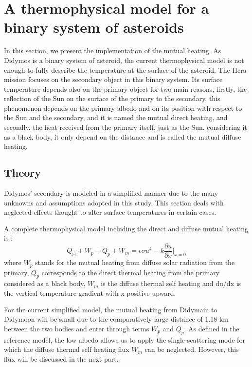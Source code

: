 \section{A thermophysical model for a binary system of asteroids}
\label{mutual}

In this section, we present the implementation of the mutual heating. As Didymos is a binary system of asteroid, the current thermophysical model is not enough to fully describe the temperature at the surface of the asteroid. The Hera mission focuses on the secondary object in this binary system. Its surface temperature depends also on the primary object for two main reasons, firstly, the reflection of the Sun on the surface of the primary to the secondary, this phenomenon depends on the primary albedo and on its position with respect to the Sun and the secondary, and it is named the mutual direct heating, and secondly, the heat received from the primary itself, just as the Sun, considering it as a black body, it only depend on the distance and is called the mutual diffuse heating.

\subsection{Theory}

Didymos’ secondary is modeled in a simplified manner due to the many unknowns and assumptions adopted in this study. This section deals with neglected effects thought to alter surface temperatures in certain cases.

A complete thermophysical model including the direct and diffuse mutual heating is \cite{pelivan}:
\begin{equation}
    Q_\odot+W_p+Q_p+W_m=\epsilon\sigma u^4-k\frac{\partial{u}}{\partial{x}}\Big|_{x=0}
    \label{eq:4.1}
\end{equation}
where $W_p$ stands for the mutual heating from diffuse solar radiation from the primary, $Q_p$ corresponds to the direct thermal heating from the primary considered as a black body, $W_m$ is the diffuse thermal self heating and du/dx is the vertical temperature gradient with x positive upward.

For the current simplified model, the mutual heating from Didymain to Didymoon will be small due to the comparatively large distance of 1.18 km \citep{model} between the two bodies and enter through terms $W_p$ and $Q_p$. As defined in the reference model, the low albedo allows us to apply the single-scattering mode for which the diffuse thermal self heating flux $W_m$ can be neglected. However, this flux will be discussed in the next part.

